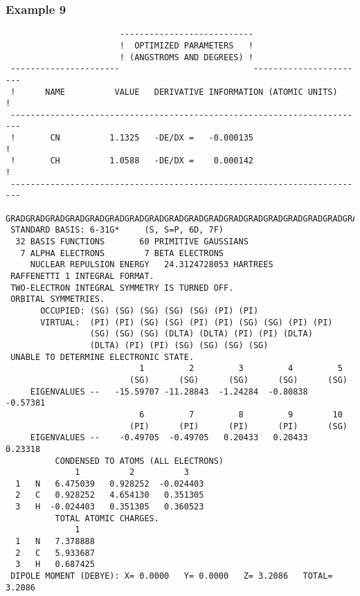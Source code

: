 \subsubsection{\sf Example 9}
{\small
\begin{verbatim}
                       ---------------------------
                       !  OPTIMIZED PARAMETERS   !
                       ! (ANGSTROMS AND DEGREES) !
 ----------------------                           -----------------------
 !      NAME          VALUE   DERIVATIVE INFORMATION (ATOMIC UNITS)     !
 ------------------------------------------------------------------------
 !       CN          1.1325   -DE/DX =   -0.000135                      !
 !       CH          1.0588   -DE/DX =    0.000142                      !
 ------------------------------------------------------------------------
 GRADGRADGRADGRADGRADGRADGRADGRADGRADGRADGRADGRADGRADGRADGRADGRADGRADGRAD
 STANDARD BASIS: 6-31G*     (S, S=P, 6D, 7F)
  32 BASIS FUNCTIONS       60 PRIMITIVE GAUSSIANS
   7 ALPHA ELECTRONS        7 BETA ELECTRONS
     NUCLEAR REPULSION ENERGY   24.3124728053 HARTREES
 RAFFENETTI 1 INTEGRAL FORMAT.
 TWO-ELECTRON INTEGRAL SYMMETRY IS TURNED OFF.
 ORBITAL SYMMETRIES.
       OCCUPIED: (SG) (SG) (SG) (SG) (SG) (PI) (PI)
       VIRTUAL:  (PI) (PI) (SG) (SG) (PI) (PI) (SG) (SG) (PI) (PI)
                 (SG) (SG) (SG) (DLTA) (DLTA) (PI) (PI) (DLTA)
                 (DLTA) (PI) (PI) (SG) (SG) (SG) (SG)
 UNABLE TO DETERMINE ELECTRONIC STATE.
                           1         2         3         4         5
                         (SG)      (SG)      (SG)      (SG)      (SG)
     EIGENVALUES --   -15.59707 -11.28843  -1.24284  -0.80838  -0.57381
                           6         7         8         9        10
                         (PI)      (PI)      (PI)      (PI)      (SG)
     EIGENVALUES --    -0.49705  -0.49705   0.20433   0.20433   0.23318
          CONDENSED TO ATOMS (ALL ELECTRONS)
              1          2          3
  1   N   6.475039   0.928252  -0.024403
  2   C   0.928252   4.654130   0.351305
  3   H  -0.024403   0.351305   0.360523
          TOTAL ATOMIC CHARGES.
              1
  1   N   7.378888
  2   C   5.933687
  3   H   0.687425
 DIPOLE MOMENT (DEBYE): X= 0.0000   Y= 0.0000   Z= 3.2086   TOTAL= 3.2086
\end{verbatim}
}
\newpage
